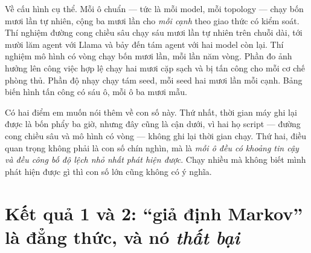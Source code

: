 \documentclass[11pt,a4paper]{article}
\newcommand{\slide}[1]{\section{#1}}
\begin{document}
Về cấu hình cụ thể. Mỗi ô chuẩn --- tức là mỗi model, mỗi topology --- chạy bốn mươi lần
tự nhiên, cộng ba mươi lần cho \emph{mỗi cạnh} theo giao thức có kiểm soát. Thí nghiệm
đường cong chiều sâu chạy sáu mươi lần tự nhiên trên chuỗi dài, tới mười lăm agent với
Llama và bảy đến tám agent với hai model còn lại. Thí nghiệm mô hình có vòng chạy bốn
mươi lần, mỗi lần năm vòng. Phần đo ảnh hưởng lên công việc hợp lệ chạy hai mươi cặp
sạch và bị tấn công cho mỗi cơ chế phòng thủ. Phần độ nhạy chạy tám seed, mỗi seed hai
mươi lần mỗi cạnh. Bảng biến hình tấn công có sáu ô, mỗi ô ba mươi mẫu.

Có hai điểm em muốn nói thêm về con số này. Thứ nhất, thời gian máy ghi lại được là bốn
phẩy ba giờ, nhưng đây cũng là cận dưới, vì hai họ script --- đường cong chiều sâu và mô
hình có vòng --- không ghi lại thời gian chạy. Thứ hai, điều quan trọng không phải là con
số chín nghìn, mà là \emph{mỗi ô đều có khoảng tin cậy và đều công bố độ lệch nhỏ nhất
phát hiện được}. Chạy nhiều mà không biết mình phát hiện được gì thì con số lớn cũng
không có ý nghĩa.

\slide{Kết quả 1 và 2: ``giả định Markov'' là đẳng thức, và nó \emph{thất bại}}
\end{document}
